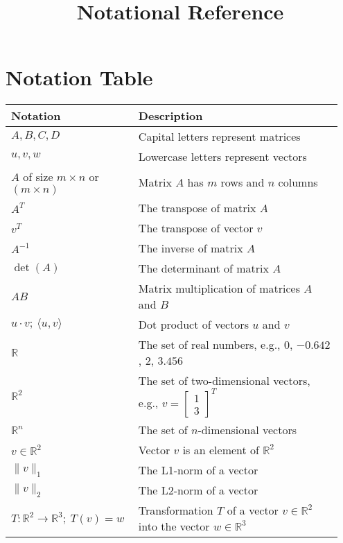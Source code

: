 \documentclass[12pt]{article}
\title{Notational Reference}
\begin{document}
\section*{Notation Table}

\begin{center}
\renewcommand{\arraystretch}{1.5}
\begin{tabular}{|p{0.35\linewidth}|p{0.6\linewidth}|}
\hline
\textbf{Notation} & \textbf{Description} \\
\hline
$A, B, C,D$ & Capital letters represent matrices \\
\hline
$u, v, w$ & Lowercase letters represent vectors \\
\hline
$A$ of size $m \times n$ or $(m \times n)$ & Matrix $A$ has $m$ rows and $n$ columns \\
\hline
$A^T$ & The transpose of matrix $A$ \\
\hline
$v^T$ & The transpose of vector $v$ \\
\hline
$A^{-1}$ & The inverse of matrix $A$ \\
\hline
$\det(A)$ & The determinant of matrix $A$ \\
\hline
$AB$ & Matrix multiplication of matrices $A$ and $B$ \\
\hline
$u \cdot v;\ \langle u, v \rangle$ & Dot product of vectors $u$ and $v$ \\
\hline
$\mathbb{R}$ & The set of real numbers, e.g., $0$, $-0.642$, $2$, $3.456$ \\
\hline
$\mathbb{R}^2$ & The set of two-dimensional vectors, e.g., $v = \begin{bmatrix} 1 \\ 3 \end{bmatrix}^{T}$ \\
\hline
$\mathbb{R}^n$ & The set of $n$-dimensional vectors \\
\hline
$v \in \mathbb{R}^2$ & Vector $v$ is an element of $\mathbb{R}^2$ \\
\hline
$\|v\|_1$ & The L1-norm of a vector \\
\hline
$\|v\|_2$ & The L2-norm of a vector \\
\hline
$T : \mathbb{R}^2 \to \mathbb{R}^3;\ T(v) = w$ & Transformation $T$ of a vector $v \in \mathbb{R}^2$ into the vector $w \in \mathbb{R}^3$ \\
\hline
\end{tabular}
\end{center}
\end{document}
